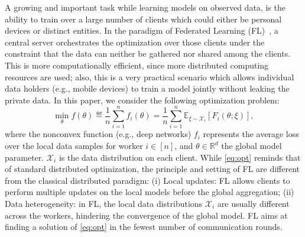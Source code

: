 \documentclass[nohyperref]{article}
\theoremstyle{plain}
\theoremstyle{definition}
\theoremstyle{remark}
\begin{document}
A growing and important task while learning models on observed data, is the ability to train over a large number of clients which could either be personal devices or distinct entities.
In the paradigm of Federated Learning (FL)~\citep{konevcny2016federated,mcmahan2017communication}, a central server orchestrates the optimization over those clients under the constraint that the data can neither be gathered nor shared among the clients.
This is more computationally efficient, since more distributed computing resources are used; also, this is a very practical scenario which allows individual data holders (e.g., mobile devices) to train a  model jointly without leaking the private data. In this paper, we consider the following optimization problem:
\begin{equation}\label{eq:opt}
\min_{\theta} f(\theta) \eqdef \frac{1}{n} \sum_{i=1}^n f_i(\theta)= \frac{1}{n} \sum_{i=1}^n \mathbb E_{\xi\sim \mathcal X_i}[F_i(\theta;\xi)],
\end{equation}
where the nonconvex function (e.g., deep networks) $f_i$ represents the average loss over the local data samples for worker $i \in [n]$, and $\theta\in\mathbb R^d$ the global model parameter. 
$\mathcal X_i$ is the data distribution on each client. 
While \eqref{eq:opt} reminds that of standard distributed optimization, the principle and setting of FL are different from the classical distributed paradigm: (i) Local updates: FL allows clients to perform multiple updates on the local models before the global aggregation; (ii) Data heterogeneity: in FL, the local data distributions $\mathcal X_i$ are usually different across the workers, hindering the convergence of the global model. 
FL aims at finding a solution of \eqref{eq:opt} in the fewest number of communication rounds. 


\end{document}
